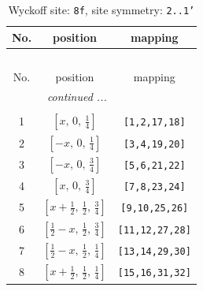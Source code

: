 \documentclass[fleqn,8pt]{jsarticle}
\begin{document}
\begin{longtable}{ccc}
\caption{Wyckoff site: {\tt 8f}, site symmetry: {\tt 2..1'}}
 \\
 \hline \hline
No. & position & mapping \\ \hline \endfirsthead

\multicolumn{2}{l}{\tablename\ \thetable{}} \\
 \hline \hline
No. & position & mapping \\ \hline \endhead

 \hline \hline
\multicolumn{2}{r}{\footnotesize\it continued ...} \\ \endfoot

 \hline \hline
\multicolumn{2}{r}{} \\ \endlastfoot

1 & $\left[ x,\, 0,\, \frac{1}{4} \right]$ & {\tt [1,2,17,18]} \\ \hline
2 & $\left[ - x,\, 0,\, \frac{1}{4} \right]$ & {\tt [3,4,19,20]} \\ \hline
3 & $\left[ - x,\, 0,\, \frac{3}{4} \right]$ & {\tt [5,6,21,22]} \\ \hline
4 & $\left[ x,\, 0,\, \frac{3}{4} \right]$ & {\tt [7,8,23,24]} \\ \hline
5 & $\left[ x + \frac{1}{2},\, \frac{1}{2},\, \frac{3}{4} \right]$ & {\tt [9,10,25,26]} \\ \hline
6 & $\left[ \frac{1}{2} - x,\, \frac{1}{2},\, \frac{3}{4} \right]$ & {\tt [11,12,27,28]} \\ \hline
7 & $\left[ \frac{1}{2} - x,\, \frac{1}{2},\, \frac{1}{4} \right]$ & {\tt [13,14,29,30]} \\ \hline
8 & $\left[ x + \frac{1}{2},\, \frac{1}{2},\, \frac{1}{4} \right]$ & {\tt [15,16,31,32]} \\
\end{longtable}
\renewcommand{\arraystretch}{1.2}
\end{document}
